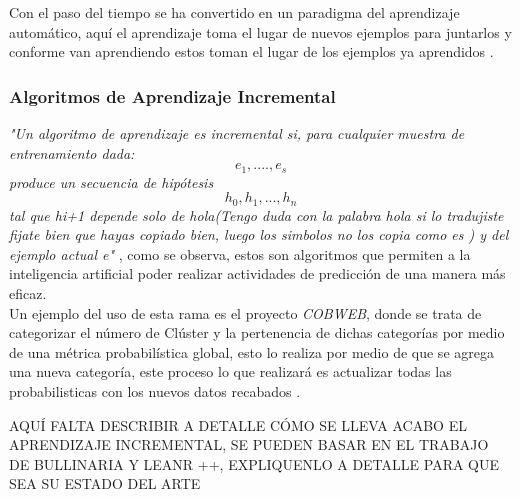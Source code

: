         Con el paso del tiempo se ha convertido en un paradigma del aprendizaje automático, aquí el aprendizaje toma el lugar de nuevos ejemplos para juntarlos 
        y conforme van aprendiendo estos toman el lugar de los ejemplos ya aprendidos \cite{liu2015}.

        \subsubsection{Algoritmos de Aprendizaje Incremental}
            \textit{"Un algoritmo de aprendizaje es incremental si,
            para cualquier muestra de entrenamiento dada:
            \begin{equation}
                e_{1} , .... , e_{s}
			\end{equation}
            produce un secuencia de hipótesis 
            \begin{equation}
                h_{0} , h_{1}, . . . , h_{n} 
            \end{equation}
            tal que hi+1 depende solo de hola(Tengo duda con la palabra hola si lo tradujiste fijate bien que hayas copiado bien, luego los simbolos no los copia como es ) y del ejemplo actual e"} \cite{GiraudCarrier2000}, como se 
            observa, estos son algoritmos que permiten a la inteligencia artificial poder realizar actividades de predicci\'on 
            de una manera m\'as eficaz.\\
            Un ejemplo del uso de esta rama es el proyecto \textit{COBWEB}, donde se trata de categorizar el n\'umero de Cl\'uster y la pertenencia 
            de dichas categor\'ias por medio de una m\'etrica probabil\'istica global, esto lo realiza por medio de que se agrega 
            una nueva categor\'ia, este proceso lo que realizar\'a es actualizar todas las probabilisticas con los nuevos datos recabados \cite{fisher1987}.


AQUÍ FALTA DESCRIBIR A DETALLE CÓMO SE LLEVA ACABO EL APRENDIZAJE INCREMENTAL, SE PUEDEN BASAR EN EL TRABAJO DE BULLINARIA Y LEANR ++, EXPLIQUENLO A DETALLE PARA QUE SEA SU ESTADO DEL ARTE


